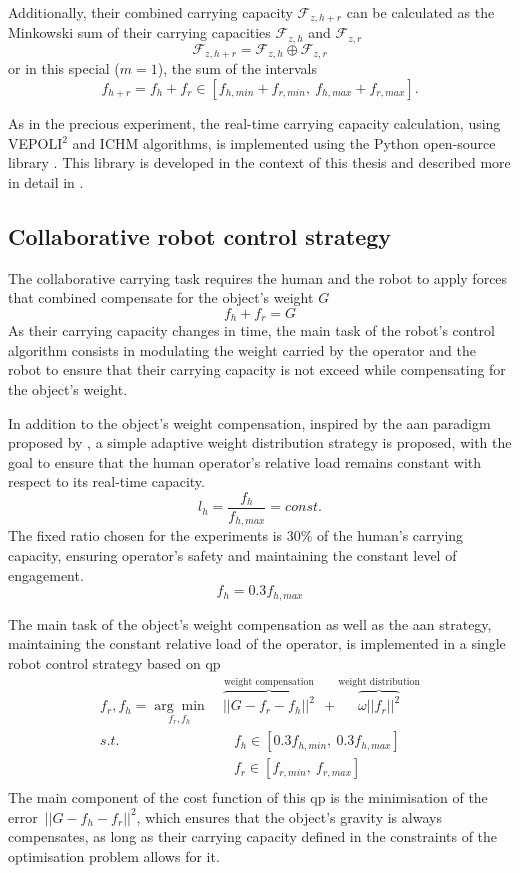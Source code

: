 Additionally, their combined carrying capacity $\mathcal{F}_{z,h+r}$ can be calculated as the Minkowski sum of their carrying capacities $\mathcal{F}_{z,h}$ and $\mathcal{F}_{z,r}$ 
$$\mathcal{F}_{z,h+r} = \mathcal{F}_{z,h}\oplus \mathcal{F}_{z,r}$$
or in this special ($m=1$), the sum of the intervals 
$$f_{h+r} = f_{h}+f_{r} \in  [f_{h,min} + f_{r,min}, ~f_{h,max} + f_{r,max}].$$

As in the precious experiment, the real-time carrying capacity calculation, using VEPOLI$^2$ and ICHM algorithms, is implemented using the Python open-source library . This library is developed in the context of this thesis and described more in detail in .

\subsection{Collaborative robot control strategy}
\label{sec:collab_robot_control_human_robot}

The collaborative carrying task requires the human and the robot to apply forces that combined compensate for the object's weight $G$ 
$$f_{h} + f_{r} = G$$
As their carrying capacity changes in time, the main task of the robot's control algorithm consists in modulating the weight carried by the operator and the robot to ensure that their carrying capacity is not exceed while compensating for the object's weight.

In addition to the object's weight compensation, inspired by the \gls{aan} paradigm proposed by 
\citet{carmichael2013admittance}, a simple adaptive weight distribution strategy is proposed, with the goal to ensure that the human operator's relative load remains constant with respect to its real-time capacity. 
$$l_h = \frac{f_h}{f_{h,max}} = const.$$
The fixed ratio chosen for the experiments is 30\% of the human's carrying capacity, ensuring operator's safety and maintaining the constant level of engagement.
$$
f_h = 0.3 f_{h,max}
$$

The main task of the object's weight compensation as well as the \gls{aan} strategy, maintaining the constant relative load of the operator, is implemented in a single robot control strategy based on \gls{qp}
\begin{equation}
\begin{split}
    f_r,f_h =\underset{f_r,f_h}{\arg\min} &~\overbrace{||G- f_r -f_h||^2}^{\text{weight compensation}} ~~+ \overbrace{\omega||f_r||^2}^{\text{weight distribution}}\\
    s.t.& \quad f_h \in[0.3f_{h,min}, ~0.3f_{h,max}]\\
    & \quad f_r \in[f_{r,min}, ~f_{r,max}]\\
\end{split}
\label{eq:qp_human_robot}
\end{equation}
The main component of the cost function of this \gls{qp} is the minimisation of the error~${||G\! -\! f_{h}\! -\!f_{r}||^2}$, which ensures that the object's gravity is always compensates, as long as their carrying capacity defined in the constraints of the optimisation problem allows for it. 

